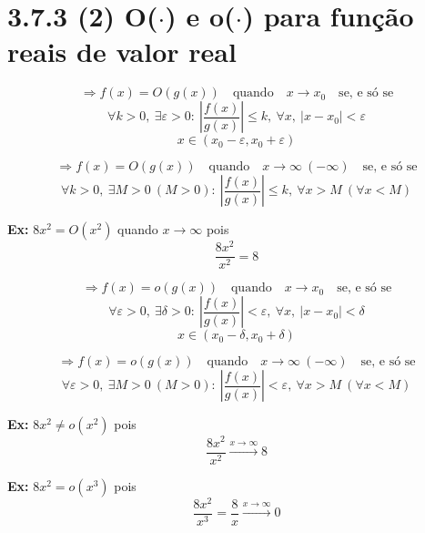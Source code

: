\section*{3.7.3 (2) O($\cdot$) e o($\cdot$) para função reais de valor real}

\[
\Rightarrow f(x) = O(g(x)) \quad \text{quando} \quad x \to x_0 \quad \text{se, e só se}
\]
\[
\forall k > 0, \ \exists \varepsilon > 0 : \ \left| \frac{f(x)}{g(x)} \right| \leq k, \ \forall x, \ |x - x_0| < \varepsilon
\]
\[
x \in (x_0 - \varepsilon, x_0 + \varepsilon)
\]

\[
\Rightarrow f(x) = O(g(x)) \quad \text{quando} \quad x \to \infty \ (-\infty) \quad \text{se, e só se}
\]
\[
\forall k > 0, \ \exists M > 0 \ (M > 0) : \ \left| \frac{f(x)}{g(x)} \right| \leq k, \ \forall x > M \ (\forall x < M)
\]

\textbf{Ex:} \quad $8x^2 = O(x^2)$ \quad quando \quad $x \to \infty$ \quad pois
\[
\frac{8x^2}{x^2} = 8
\]

\[
\Rightarrow f(x) = o(g(x)) \quad \text{quando} \quad x \to x_0 \quad \text{se, e só se}
\]
\[
\forall \varepsilon > 0, \ \exists \delta > 0 : \ \left| \frac{f(x)}{g(x)} \right| < \varepsilon, \ \forall x, \ |x - x_0| < \delta
\]
\[
x \in (x_0 - \delta, x_0 + \delta)
\]

\[
\Rightarrow f(x) = o(g(x)) \quad \text{quando} \quad x \to \infty \ (-\infty) \quad \text{se, e só se}
\]
\[
\forall \varepsilon > 0, \ \exists M > 0 \ (M > 0) : \ \left| \frac{f(x)}{g(x)} \right| < \varepsilon, \ \forall x > M \ (\forall x < M)
\]

\textbf{Ex:} \quad $8x^2 \neq o(x^2)$ \quad pois
\[
\frac{8x^2}{x^2} \xrightarrow{x \to \infty} 8
\]

\textbf{Ex:} \quad $8x^2 = o(x^3)$ \quad pois
\[
\frac{8x^2}{x^3} = \frac{8}{x} \xrightarrow{x \to \infty} 0
\]